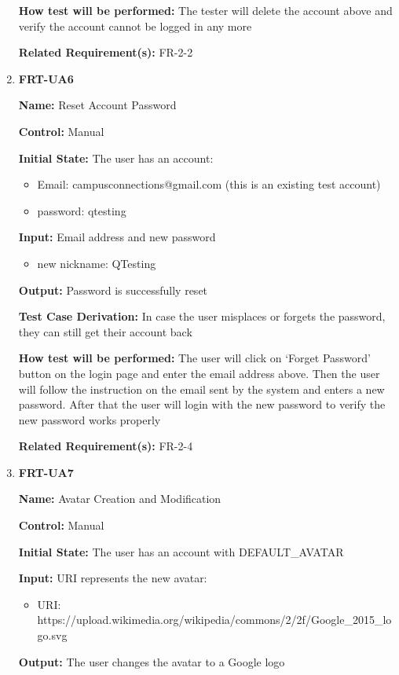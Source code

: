 \documentclass[12pt, titlepage]{article}
\begin{document}
\begin{enumerate}
\textbf{How test will be performed:} The tester will delete the account above and verify the account cannot be logged in any more

\textbf{Related Requirement(s):} FR-2-2

\item{\textbf{FRT-UA6}}

\textbf{Name:} Reset Account Password

\textbf{Control:} Manual
					
\textbf{Initial State:} The user has an account:
\begin{itemize}
\item Email: campusconnections@gmail.com (this is an existing test account)
\item password: qtesting
\end{itemize}

\textbf{Input:} Email address and new password
\begin{itemize}
\item new nickname: QTesting
\end{itemize}
					
\textbf{Output:} Password is successfully reset

\textbf{Test Case Derivation:} In case the user misplaces or forgets the password, they can still get their account back
					
\textbf{How test will be performed:} The user will click on `Forget Password' button on the login page and enter the email address above. Then the user will follow the instruction on the email sent by the system and enters a new password. After that the user will login with the new password to verify the new password works properly

\textbf{Related Requirement(s):} FR-2-4

\item{\textbf{FRT-UA7}}

\textbf{Name:} Avatar Creation and Modification

\textbf{Control:} Manual
					
\textbf{Initial State:} The user has an account with DEFAULT\_AVATAR

\textbf{Input:} URI represents the new avatar:
\begin{itemize}
\item URI: https://upload.wikimedia.org/wikipedia/commons/2/2f/Google\_2015\_logo.svg
\end{itemize}
					
\textbf{Output:} The user changes the avatar to a Google logo


\end{enumerate}
\end{document}
